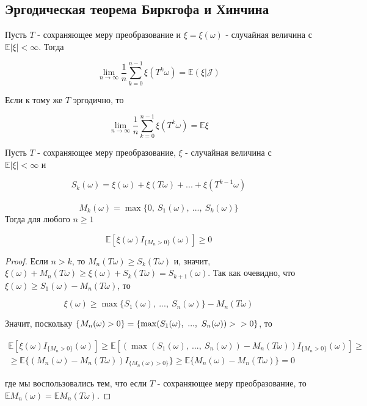 \subsection{Эргодическая теорема Биркгофа и Хинчина}


\begin{theorem} Пусть $T$ - сохраняющее меру преобразование и $\xi = \xi(\omega)$ - случайная величина с $\mathbb{E}|\xi| < \infty$. Тогда 

{\centering 
\begin{equation}
\lim_{n\to\infty} \frac{1}{n}\sum_{k=0}^{n-1}\xi(T^{k}\omega) = \mathbb{E}(\xi|\mathscr{J})
\end{equation}
}

Если к тому же $T$ эргодично, то

{\centering 
\begin{equation}
\lim_{n\to\infty} \frac{1}{n}\sum_{k=0}^{n-1}\xi(T^{k}\omega) = \mathbb{E}\xi
\end{equation}
}
\end{theorem}


\begin{lemma} Пусть $T$ - сохраняющее меру преобразование, $\xi$ - случайная величина с \\ $\mathbb{E}|\xi| <\infty$ и 

{\centering 
$$S_k(\omega) = \xi(\omega) + \xi(T\omega) + ... + \xi(T^{k-1}\omega)$$ \\
$$M_k(\omega) = \max\{0, ~S_1(\omega), ~..., ~S_k(\omega)\}$$}
\noindent Тогда для любого $n \geq 1$

{\centering 
$$\mathbb{E}[\xi(\omega)I_{\{M_n > 0\}}(\omega)] \geq 0$$}
\end{lemma}

\begin{proof} Если $n > k$, то $M_n(T\omega) \geq S_k(T\omega)$ и, значит, $\xi(\omega) + M_n(T\omega) \geq \xi(\omega) + S_k(T\omega) = S_{k+1}(\omega)$. Так как очевидно, что $\xi(\omega) \geq S_1(\omega) - M_n(T\omega)$, то

{\centering 
$$\xi(\omega) \geq \max\{S_1(\omega), ~..., ~S_n(\omega)\} - M_n(T\omega)$$
\par}

Значит, поскольку $\{M_n(\omega) > 0\} = \{\max(S_1(\omega), ~..., ~S_n(\omega)) > \\ > 0\}$, то

{\centering 
\begin{equation} 
	\begin{gathered}
		\mathbb{E} [ \xi(\omega) I_{\{M_n > 0\}}(\omega)] \geq \mathbb{E}[(\max(S_1(\omega), ~..., ~S_n(\omega)) - M_n(T\omega))I_{\{M_n > 0\}}(\omega)]  \geq \\  \geq \mathbb{E}\{(M_n(\omega) - M_n(T\omega))I_{\{M_n(\omega) > 0\}}\} \geq \mathbb{E}\{M_n(\omega) - M_n(T\omega)\} = 0
	\end{gathered}
\end{equation}
}

где мы воспользовались тем, что если $T$ - сохраняющее меру преобразование, то $\mathbb{E}M_n(\omega) = \mathbb{E}M_n(T\omega)$.
\end{proof}

